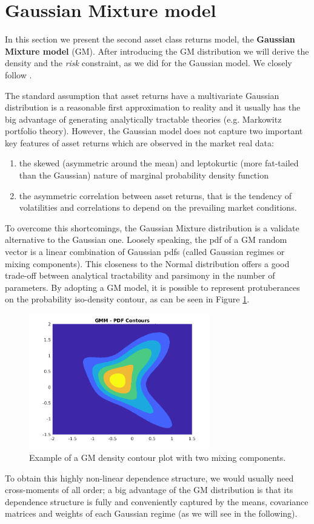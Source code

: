 \section{Gaussian Mixture model}
In this section we present the second asset class returns model, the \textbf{Gaussian Mixture model} (GM). After introducing the GM distribution we will derive the density and the \textit{risk} constraint, as we did for the Gaussian model. We closely follow \cite{BUCKLEY2008}.

The standard assumption that asset returns have a multivariate Gaussian distribution is a reasonable first approximation to reality and it usually has the big advantage of generating analytically tractable theories (e.g. Markowitz portfolio theory). However, the Gaussian model does not capture two important key features of asset returns which are observed in the market real data:
\begin{enumerate}
	\item the skewed (asymmetric around the mean) and leptokurtic (more fat-tailed than the Gaussian) nature of marginal probability density function
	\item the asymmetric correlation between asset returns, that is the tendency of volatilities and correlations to depend on the prevailing market conditions.
\end{enumerate}
To overcome this shortcomings, the Gaussian Mixture distribution is a validate alternative to the Gaussian one. Loosely speaking, the pdf of a GM random vector is a linear combination of Gaussian pdfs (called Gaussian regimes or mixing components). This closeness to the Normal distribution offers a good trade-off between analytical tractability and parsimony in the number of parameters. By adopting a GM model, it is possible to represent protuberances on the probability iso-density contour, as can be seen in Figure \ref{fig:countour_GM}.
\begin{figure}[]
	\centering
	\includegraphics[width=0.7\textwidth]{Images/GMdensity.png}
	\caption{Example of a GM density contour plot with two mixing components.}
	\label{fig:countour_GM}
\end{figure}
To obtain this highly non-linear dependence structure, we would usually need cross-moments of all order; a big advantage of the GM distribution is that its dependence structure is fully and conveniently captured by the means, covariance matrices and weights of each Gaussian regime (as we will see in the following).

